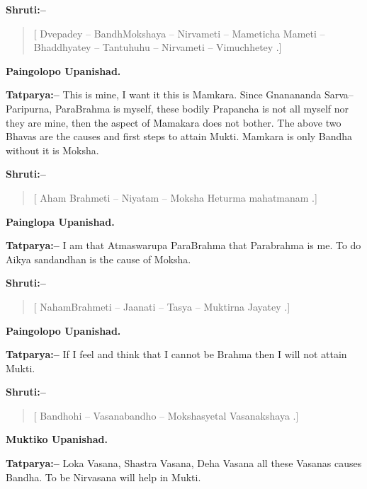 \textbf{Shruti:–}

\begin{verse}
[ Dvepadey – BandhMokshaya – Nirvameti – Mameticha  Mameti – Bhaddhyatey – Tantuhuhu – Nirvameti – Vimuchhetey .]
\end{verse}

\begin{flushright}
\textbf{Paingolopo Upanishad.}
\end{flushright}

\textbf{Tatparya:–} This is mine, I want it this is Mamkara. Since Gnanananda Sarva–Paripurna, ParaBrahma is myself, these bodily Prapancha is not all myself nor they are mine, then the aspect of Mamakara does not bother. The above two Bhavas are the causes and first steps to attain Mukti. Mamkara is only Bandha without it is Moksha.

\textbf{Shruti:–}

\begin{verse}
[ Aham Brahmeti – Niyatam – Moksha Heturma mahatmanam .]
\end{verse}

\begin{flushright}
\textbf{Painglopa Upanishad.}
\end{flushright}

\textbf{Tatparya:–} I am that Atmaswarupa ParaBrahma that Parabrahma is me. To do Aikya sandandhan is the cause of Moksha.

\textbf{Shruti:–}

\begin{verse}
[ NahamBrahmeti – Jaanati – Tasya – Muktirna Jayatey .]
\end{verse}

\begin{flushright}
\textbf{Paingolopo Upanishad.}
\end{flushright}

\textbf{Tatparya:–} If I feel and think that I cannot be Brahma then I will not attain Mukti.

\textbf{Shruti:–}

\begin{verse}
[ Bandhohi – Vasanabandho – Mokshasyetal Vasanakshaya .]
\end{verse}

\begin{flushright}
\textbf{Muktiko Upanishad.}
\end{flushright}

\textbf{Tatparya:–} Loka Vasana, Shastra Vasana, Deha Vasana all these Vasanas causes Bandha. To be Nirvasana will help in Mukti.

